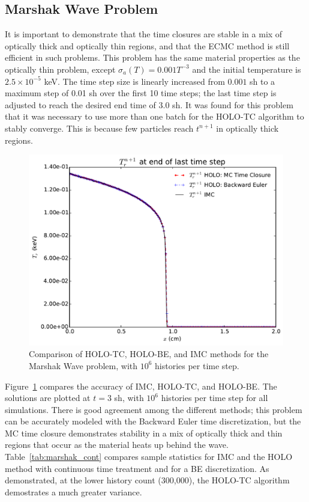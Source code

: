 \documentclass{anstrans}
\begin{document}
\subsection{Marshak Wave Problem}

It is important to demonstrate that the time closures are stable in a mix of optically
thick and optically thin regions, and that the ECMC method is still efficient in such
problems.  This problem has the same material properties as the optically thin problem, except
$\sigma_a(T) = 0.001 T^{-3}$ and the initial temperature is $2.5\times10^{-5}$ keV.  The time step size is linearly increased from $0.001$ sh to a
maximum step of 0.01 sh over the first 10 time steps; the last time step is adjusted to
reach the desired end time of $3.0$ sh.  It was found for this problem that it was
necessary to use more than one batch for the HOLO-TC algorithm to stably converge.
This is because few particles reach $t^{n+1}$ in optically
thick regions.
\begin{figure}
    \centering
    \includegraphics[width=\linewidth]{marshak_time_cont_compare.pdf}
    \caption{\label{fig:marshak_tc} Comparison of HOLO-TC, HOLO-BE, and IMC methods for
the Marshak Wave problem, with $10^6$ histories per time step.}
\end{figure}

Figure~\ref{fig:marshak_tc} compares the accuracy of IMC, HOLO-TC, and HOLO-BE.  The
solutions are plotted at $t=3$ sh, with $10^6$ histories per time step for all
simulations. There is good agreement among the different methods; this problem can be accurately modeled with the Backward Euler time discretization, but
the MC time closure demonstrates stability in a mix of optically thick and thin
regions that occur as the material heats up behind the wave. Table~\ref{tab:marshak_cont} compares sample statistics for IMC and
the HOLO method with continuous time treatment and for a BE discretization.  As
demonstrated, at the lower history count (300,000), the HOLO-TC algorithm demostrates a
much greater variance.  
\end{document}
